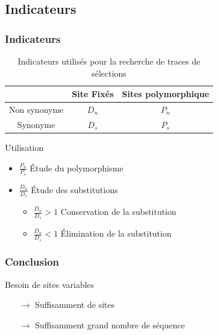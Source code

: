 \subsection{Indicateurs}
\begin{frame}
    \frametitle{Indicateurs}
    
    \begin{table}
        \centering
        \small
        \begin{tabular}{c c c}
           
            \toprule
              & Site Fixés & Sites polymorphique \\
            \midrule
            Non synonyme & $D_n$ & $P_n$ \\
            Synonyme & $D_s$ & $P_s$ \\

            \bottomrule
           
        \end{tabular}
         \caption{Indicateurs utilisés pour la recherche de traces de sélections}
    \end{table}

    \begin{exampleblock}{Utilisation}
        \begin{itemize}
            \item  $\frac{P_n}{P_s}$ Étude du polymorphisme 
            \item  $\frac{D_n}{D_s}$ Étude des substitutions
            \begin{itemize}
                \item $\frac{D_n}{D_s} > 1$ Conservation de la substitution
                \item $\frac{D_n}{D_s} < 1$ Élimination de la substitution
            \end{itemize}

        \end{itemize}
    \end{exampleblock}

    
\end{frame}

\begin{frame}
    \frametitle{Conclusion}
     \begin{alertblock}{ Besoin de sites variables}
        \begin{itemize}
            \item[$\rightarrow$] Suffisamment de sites
            \item[$\rightarrow$] Suffisamment grand nombre de séquence
        \end{itemize}
    \end{alertblock}
    
\end{frame}

